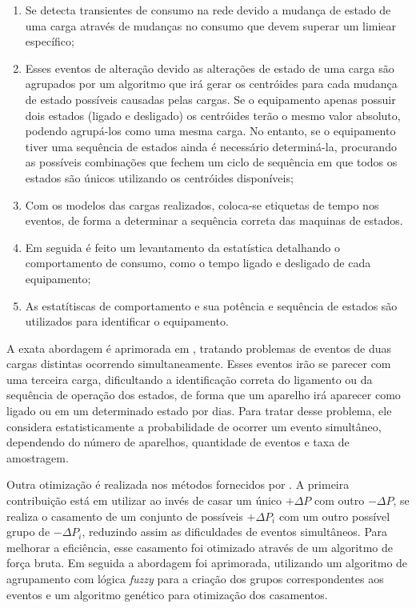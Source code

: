 \begin{enumerate}
\item Se detecta transientes de consumo na rede devido a mudança de estado de uma carga 
através de mudanças no consumo que devem superar um limiear específico; 
\item Esses eventos de alteração devido as alterações de estado de uma carga são agrupados por um 
algoritmo que irá gerar os centróides para cada mudança de estado possíveis causadas pelas
cargas. Se o equipamento apenas possuir dois estados (ligado e desligado) os
centróides terão o mesmo valor absoluto, podendo agrupá-los como uma mesma
carga. No entanto, se o equipamento tiver uma sequência de estados ainda é
necessário determiná-la, procurando as possíveis combinações que fechem um ciclo
de sequência em que todos os estados são únicos utilizando os centróides
disponíveis; 
\item Com os modelos das cargas realizados, coloca-se etiquetas de tempo
nos eventos, de forma a determinar a sequência correta das maquinas de estados.
\item Em seguida é feito um levantamento da estatística detalhando o comportamento de 
consumo, como o tempo ligado e desligado de cada equipamento;
\item As estatítiscas de comportamento e sua potência e sequência de estados são
utilizados para identificar o equipamento.
\end{enumerate}

A exata abordagem é aprimorada em \cite{nilm_cole_eventos_simultaneos}, tratando
problemas de eventos de duas cargas distintas ocorrendo simultaneamente. Esses
eventos irão se parecer com uma terceira carga, dificultando a identificação
correta do ligamento ou da sequência de operação dos estados, de forma que um
aparelho irá aparecer como ligado ou em um determinado estado por dias. Para
tratar desse problema, ele considera estatisticamente a probabilidade de ocorrer
um evento simultâneo, dependendo do número de aparelhos, quantidade de eventos e
taxa de amostragem.

Outra otimização é realizada nos métodos fornecidos por 
\cite{nilm_baranski_genetic_base,nilm_baraski_genetic_detalhado}.
A primeira contribuição está em utilizar ao invés de casar um único $+\Delta{P}$ 
com outro $-\Delta{P}$, se realiza o casamento
de um conjunto de possíveis $+\Delta{P}_i$ com um outro possível grupo de
$-\Delta{P}_i$, reduzindo assim as dificuldades de eventos simultâneos.
Para melhorar a eficiência, esse casamento foi otimizado através 
de um algoritmo de força bruta. Em seguida a abordagem foi aprimorada,
utilizando um algoritmo de agrupamento com lógica \emph{fuzzy} para a criação
dos grupos correspondentes aos eventos e um algoritmo genético para otimização
dos casamentos.

